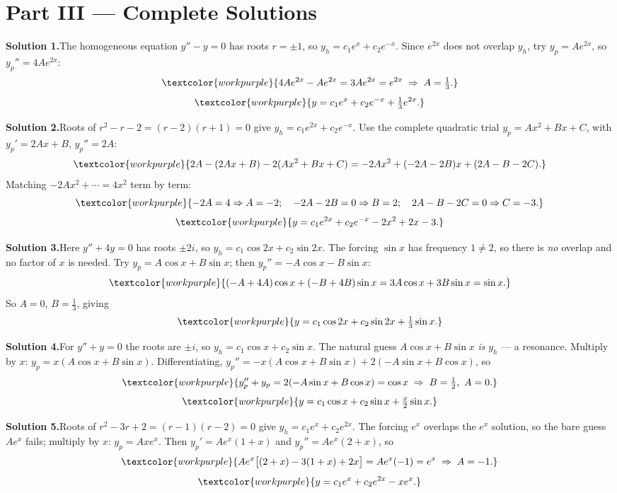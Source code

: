 \section*{Part III --- Complete Solutions}

\noindent\textbf{Solution 1.}\quad The homogeneous equation $y''-y=0$ has roots
$r=\pm 1$, so $y_h = c_1 e^{x} + c_2 e^{-x}$. Since $e^{2x}$ does not overlap
$y_h$, try $y_p = A e^{2x}$, so $y_p'' = 4A e^{2x}$:
\[ \textcolor{workpurple}{4A e^{2x} - A e^{2x} = 3A e^{2x} = e^{2x} \;\Rightarrow\; A = \tfrac{1}{3}.} \]
\[ \textcolor{workpurple}{y = c_1 e^{x} + c_2 e^{-x} + \tfrac{1}{3} e^{2x}.} \]

\medskip
\noindent\textbf{Solution 2.}\quad Roots of $r^2 - r - 2 = (r-2)(r+1)=0$ give
$y_h = c_1 e^{2x} + c_2 e^{-x}$. Use the complete quadratic trial
$y_p = Ax^2 + Bx + C$, with $y_p' = 2Ax+B$, $y_p'' = 2A$:
\[ \textcolor{workpurple}{2A - (2Ax+B) - 2(Ax^2+Bx+C) = -2A x^2 + (-2A-2B)x + (2A - B - 2C).} \]
Matching $-2Ax^2 + \cdots = 4x^2$ term by term:
\[ \textcolor{workpurple}{-2A = 4 \Rightarrow A=-2; \quad -2A-2B = 0 \Rightarrow B = 2; \quad 2A - B - 2C = 0 \Rightarrow C = -3.} \]
\[ \textcolor{workpurple}{y = c_1 e^{2x} + c_2 e^{-x} - 2x^2 + 2x - 3.} \]

\medskip
\noindent\textbf{Solution 3.}\quad Here $y''+4y=0$ has roots $\pm 2i$, so
$y_h = c_1\cos 2x + c_2 \sin 2x$. The forcing $\sin x$ has frequency $1\neq 2$, so
there is \emph{no} overlap and no factor of $x$ is needed. Try
$y_p = A\cos x + B\sin x$; then $y_p'' = -A\cos x - B\sin x$:
\[ \textcolor{workpurple}{(-A + 4A)\cos x + (-B + 4B)\sin x = 3A\cos x + 3B\sin x = \sin x.} \]
So $A = 0$, $B = \tfrac{1}{3}$, giving
\[ \textcolor{workpurple}{y = c_1\cos 2x + c_2\sin 2x + \tfrac{1}{3}\sin x.} \]

\medskip
\noindent\textbf{Solution 4.}\quad For $y''+y=0$ the roots are $\pm i$, so
$y_h = c_1\cos x + c_2\sin x$. The natural guess $A\cos x + B\sin x$ \emph{is}
$y_h$ --- a resonance. Multiply by $x$: $y_p = x(A\cos x + B\sin x)$. Differentiating,
$y_p'' = -x(A\cos x + B\sin x) + 2(-A\sin x + B\cos x)$, so
\[ \textcolor{workpurple}{y_p'' + y_p = 2(-A\sin x + B\cos x) = \cos x \;\Rightarrow\; B = \tfrac{1}{2},\ A = 0.} \]
\[ \textcolor{workpurple}{y = c_1\cos x + c_2\sin x + \tfrac{x}{2}\sin x.} \]

\medskip
\noindent\textbf{Solution 5.}\quad Roots of $r^2 - 3r + 2 = (r-1)(r-2)=0$ give
$y_h = c_1 e^{x} + c_2 e^{2x}$. The forcing $e^{x}$ overlaps the $e^{x}$ solution,
so the bare guess $Ae^{x}$ fails; multiply by $x$: $y_p = A x e^{x}$. Then
$y_p' = A e^{x}(1+x)$ and $y_p'' = A e^{x}(2+x)$, so
\[ \textcolor{workpurple}{A e^{x}\big[(2+x) - 3(1+x) + 2x\big] = A e^{x}(-1) = e^{x} \;\Rightarrow\; A = -1.} \]
\[ \textcolor{workpurple}{y = c_1 e^{x} + c_2 e^{2x} - x e^{x}.} \]


